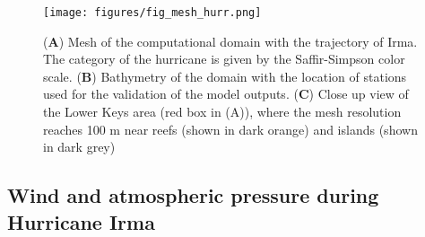 \documentclass[preprint,12pt,authoryear]{elsarticle}
\begin{document}
\begin{figure}
    \centering
    \texttt{[image: figures/fig\_mesh\_hurr.png]}
    \caption{(\textbf{A}) Mesh of the computational domain with the trajectory of Irma. The category of the hurricane is given by the Saffir-Simpson color scale. (\textbf{B}) Bathymetry of the domain with the location of stations used for the validation of the model outputs. (\textbf{C}) Close up view of the Lower Keys area (red box in (A)), where the mesh resolution reaches 100 m near reefs (shown in dark orange) and islands (shown in dark grey)}
    \label{fig:mesh}
\end{figure}

\subsection{Wind and atmospheric pressure during Hurricane Irma}
\end{document}
